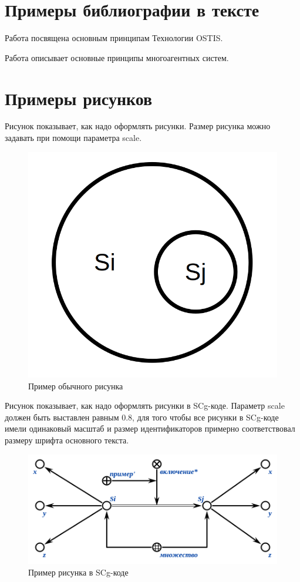 
\section*{Примеры библиографии в тексте}

Работа  посвящена основным принципам Технологии OSTIS.

Работа  описывает основные принципы многоагентных систем.

\section*{Примеры рисунков}

Рисунок \textit{} показывает, как надо оформлять рисунки. Размер рисунка можно задавать при помощи параметра scale.

\begin{figure}[H]
	\includegraphics[scale=0.5]{images/fig_example.png}
	\caption{Пример обычного рисунка}
	\label{fig:example}
\end{figure}

Рисунок \textit{} показывает, как надо оформлять рисунки в SCg-коде. Параметр scale должен быть выставлен равным 0.8, для того чтобы все рисунки в SCg-коде имели одинаковый масштаб и размер идентификаторов примерно соответствовал размеру шрифта основного текста.  

\begin{figure}[H]
	\includegraphics[scale=0.8]{images/fig_example_scg.png}
	\caption{Пример рисунка в SCg-коде}
	\label{fig:example_scg}
\end{figure}
